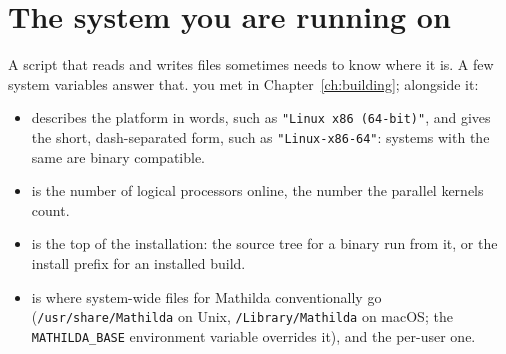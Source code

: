 
\section{The system you are running on}
\label{sec:io-system}

A script that reads and writes files sometimes needs to know where it is. A few
system variables answer that.  you met in Chapter~\ref{ch:building};
alongside it:

\begin{itemize}
  \item {} describes the platform in words, such as
        \texttt{"Linux x86 (64-bit)"}, and 
        gives the short, dash-separated form, such as \texttt{"Linux-x86-64"}:
        systems with the same  are binary compatible.
  \item {} is the number of logical
        processors online, the number the parallel kernels count.
  \item {} is the top of
        the installation: the source tree for a binary run from it, or the
        install prefix for an installed build.
  \item {} is where system-wide files
        for Mathilda conventionally go (\texttt{/usr/share/Mathilda} on Unix,
        \texttt{/Library/Mathilda} on macOS; the \texttt{MATHILDA\_BASE}
        environment variable overrides it), and
         the per-user
        one.
\end{itemize}

